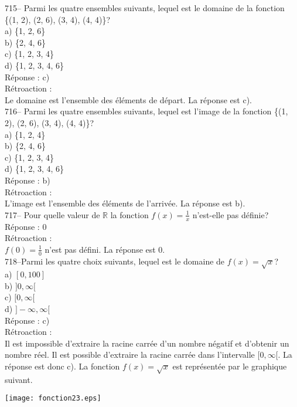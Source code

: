 ﻿\documentclass[letterpaper, 12pt]{article}
\begin{document}
715--  Parmi les quatre ensembles suivants, lequel est le domaine de la
fonction \{(1, 2), (2, 6), (3, 4), (4, 4)\}?\\
a) \{1, 2, 6\}\\
b) \{2, 4, 6\}\\
c) \{1, 2, 3, 4\}\\
d) \{1, 2, 3, 4, 6\}\\

R\'eponse : c)\\

R\'etroaction : \\
Le domaine est l'ensemble des \'el\'ements de d\'epart.  La r\'eponse est
c).\\

716--  Parmi les quatre ensembles suivants, lequel est l'image de la
fonction \{(1, 2), (2, 6), (3, 4), (4, 4)\}?\\
a) \{1, 2, 4\}\\
b) \{2, 4, 6\}\\
c) \{1, 2, 3, 4\}\\
d) \{1, 2, 3, 4, 6\}\\

R\'eponse : b)\\

R\'etroaction : \\
L'image est l'ensemble des \'el\'ements de l'arriv\'ee.  La r\'eponse est
b).\\

717-- Pour quelle valeur de $\mathbb{R}$ la fonction $f(x)=\frac{1}{x}$
n'est-elle pas d\'efinie?\\

R\'eponse : 0\\

R\'etroaction :\\
$f(0)=\frac{1}{0}$ n'est pas d\'efini.  La r\'eponse est 0.\\

718--Parmi les quatre choix suivants, lequel est le domaine de
$f(x)=\sqrt{x}$?\\
a) $[0,100]$\\
b) $]0,\infty[$\\
c) $[0,\infty[$\\
d) $]-\infty, \infty[$\\

R\'eponse : c)\\

R\'etroaction : \\
Il est impossible d'extraire la racine carr\'ee d'un nombre n\'egatif et
d'obtenir un nombre r\'eel.  Il est possible d'extraire la racine carr\'ee
dans l'intervalle $[0,\infty[$.  La r\'eponse est donc c).  La fonction
$f(x)=\sqrt{x}$ est repr\'esent\'ee par le graphique suivant.\\
    \begin{center}
    \texttt{[image: fonction23.eps]}
    \end{center}
\end{document}
